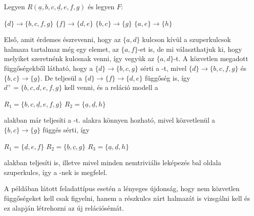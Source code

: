 \begin{pld}
Legyen $R(\underline{a},b,c,\underline{d},e,f,g)$ és legyen $F$:
\begin{center}
    $\{d\} \longrightarrow \{b,c,f,g\}$ \break
    $\{f\} \longrightarrow \{d,e\}$ \break
    $\{b,c\} \longrightarrow \{g\}$ \break
    $\{a,e\} \longrightarrow \{h\}$ 
\end{center}

Első, amit érdemes észrevenni, hogy az $\{a,d\}$ kulcson kívül a szuperkulcsok halmaza tartalmaz még egy elemet, az $\{a,f\}$-et is, de mi választhatjuk ki, hogy melyiket szeretnénk kulcsnak venni, így vegyük az $\{a,d\}$-t.
A közvetlen megadott függőségekből látható, hogy a $\{d\} \longrightarrow \{b,c,g\} $ sérti a \nfk-t, mivel $\{d\} \longrightarrow \{b,c,f,g\}$ és $\{b,c\} \longrightarrow \{g\}$. De teljesül a $\{d\} \longrightarrow \{f\} \longrightarrow \{d,e\}$ függőség is, így $d^+ = \{ b,c,d,e,f,g\}$ kell venni, és a reláció modell a 
\begin{center}
    $R_1 = \{ b,c,\underline{d},e,f,g \}$ \break
    $R_2 = \{ \underline{a},\underline{d},h \}$
\end{center}
alakban már teljesíti a \nfk-t.
\nfh alakra könnyen hozható, mivel közvetlenül a $\{b,c\} \longrightarrow \{g\}$ függés sérti, így 
\begin{center}
    $R_1 = \{ \underline{d},e,f \}$ \break
    $R_2 = \{ \underline{b}, \underline{c},g \}$ \break
    $R_3 = \{ \underline{a},\underline{d},h \}$ \break
\end{center}
alakban teljesíti is, illetve mivel minden nemtriviális leképezés bal oldala szuperkulcs, így a \BCNF-nek is megfelel. 
\end{pld}

A példában látott feladattípus esetén a lényeges újdonság, hogy nem közvetlen függőségeket kell csak figyelni, hanem a részkulcs zárt halmazát is vizsgálni kell és ez alapján létrehozni az új relációsémát. 

